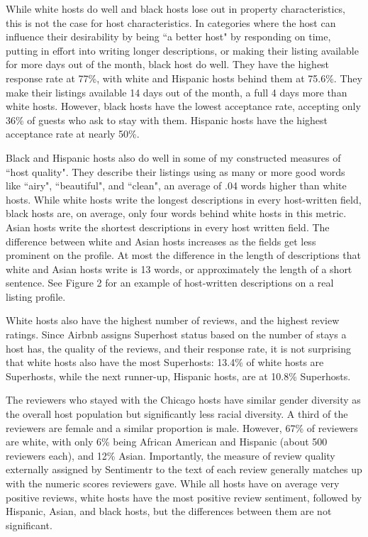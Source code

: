 While white hosts do well and black hosts lose out in property characteristics, this is not the case for host characteristics. In categories where the host can influence their desirability by being ``a better host" by responding on time, putting in effort into writing longer descriptions, or making their listing available for more days out of the month, black host do well. They have the highest response rate at 77\%, with white and Hispanic hosts behind them at 75.6\%. They make their listings available 14 days out of the month, a full 4 days more than white hosts. However, black hosts have the lowest acceptance rate, accepting only 36\% of guests who ask to stay with them. Hispanic hosts have the highest acceptance rate at nearly 50\%. 

Black and Hispanic hosts also do well in some of my constructed measures of ``host quality". They describe their listings using  as many or more good words like ``airy", ``beautiful", and ``clean", an average of .04 words higher than white hosts. While white hosts write the longest descriptions in every host-written field, black hosts are, on average, only four words behind white hosts in this metric. Asian hosts write the shortest descriptions in every host written field. The difference between white and Asian hosts increases as the fields get less prominent on the profile. At most the difference in the length of descriptions that white and Asian hosts write is 13 words, or approximately the length of a short sentence. See Figure 2 for an example of host-written descriptions on a real listing profile. 

White hosts also have the highest number of reviews, and the highest review ratings. Since Airbnb assigns Superhost status based on the number of stays a host has, the quality of the reviews, and their response rate, it is not surprising that white hosts also have the most Superhosts: 13.4\% of white hosts are Superhosts, while the next runner-up, Hispanic hosts, are at 10.8\% Superhosts. 

The reviewers who stayed with the Chicago hosts have similar gender diversity as the overall host population but significantly less racial diversity. A third of the reviewers are female and a similar proportion is male. However, 67\% of reviewers are white, with only 6\% being African American and Hispanic (about 500 reviewers each), and 12\% Asian. Importantly, the measure of review quality externally assigned by Sentimentr to the text of each review generally matches up with the numeric scores reviewers gave. While all hosts have on average very positive reviews, white hosts have the most positive review sentiment, followed by Hispanic, Asian, and black hosts, but the differences between them are not significant. 

